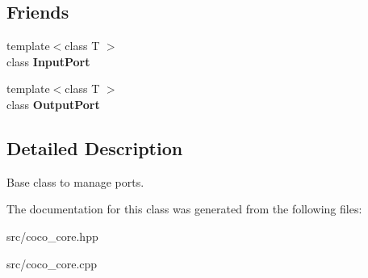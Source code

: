 \subsection*{Friends}
\begin{DoxyCompactItemize}
\item 
\hypertarget{classcoco_1_1_port_base_aa750daec74c1bf813c092ea268f3b8f8}{}{\footnotesize template$<$class T $>$ }\\class {\bfseries Input\+Port}\label{classcoco_1_1_port_base_aa750daec74c1bf813c092ea268f3b8f8}

\item 
\hypertarget{classcoco_1_1_port_base_a1b667fb33da7060c4747eeafcd85db20}{}{\footnotesize template$<$class T $>$ }\\class {\bfseries Output\+Port}\label{classcoco_1_1_port_base_a1b667fb33da7060c4747eeafcd85db20}

\end{DoxyCompactItemize}


\subsection{Detailed Description}
Base class to manage ports. 

The documentation for this class was generated from the following files\+:\begin{DoxyCompactItemize}
\item 
src/coco\+\_\+core.\+hpp\item 
src/coco\+\_\+core.\+cpp\end{DoxyCompactItemize}
